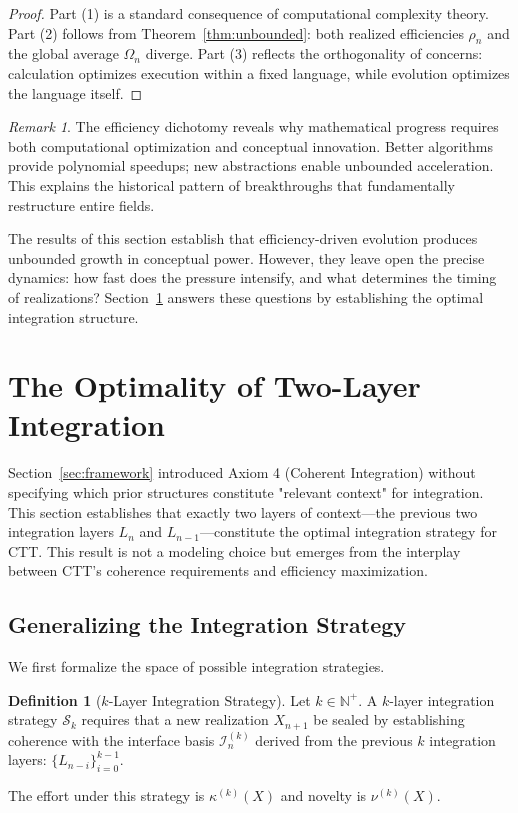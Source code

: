 \documentclass[11pt]{article}
\theoremstyle{definition}
\newtheorem{definition}{Definition}
\theoremstyle{plain}
\theoremstyle{remark}
\newtheorem{remark}{Remark}
\begin{document}
\begin{proof}
Part (1) is a standard consequence of computational complexity theory. Part (2) follows from Theorem~\ref{thm:unbounded}: both realized efficiencies $\rho_n$ and the global average $\Omega_n$ diverge. Part (3) reflects the orthogonality of concerns: calculation optimizes execution within a fixed language, while evolution optimizes the language itself.
\end{proof}

\begin{remark}
The efficiency dichotomy reveals why mathematical progress requires both computational optimization and conceptual innovation. Better algorithms provide polynomial speedups; new abstractions enable unbounded acceleration. This explains the historical pattern of breakthroughs that fundamentally restructure entire fields.
\end{remark}

The results of this section establish that efficiency-driven evolution produces unbounded growth in conceptual power. However, they leave open the precise dynamics: how fast does the pressure intensify, and what determines the timing of realizations? Section~\ref{sec:k2optimal} answers these questions by establishing the optimal integration structure.


\section{The Optimality of Two-Layer Integration}
\label{sec:k2optimal}

Section~\ref{sec:framework} introduced Axiom 4 (Coherent Integration) without specifying which prior structures constitute "relevant context" for integration. This section establishes that exactly two layers of context—the previous two integration layers $L_n$ and $L_{n-1}$—constitute the optimal integration strategy for CTT. This result is not a modeling choice but emerges from the interplay between CTT's coherence requirements and efficiency maximization.

\subsection{Generalizing the Integration Strategy}

We first formalize the space of possible integration strategies.

\begin{definition}[$k$-Layer Integration Strategy]
Let $k \in \mathbb{N}^+$. A $k$-layer integration strategy $\mathcal{S}_k$ requires that a new realization $X_{n+1}$ be sealed by establishing coherence with the interface basis $\mathcal{I}_n^{(k)}$ derived from the previous $k$ integration layers: $\{L_{n-i}\}_{i=0}^{k-1}$.

The effort under this strategy is $\kappa^{(k)}(X)$ and novelty is $\nu^{(k)}(X)$.
\end{definition}
\end{document}

